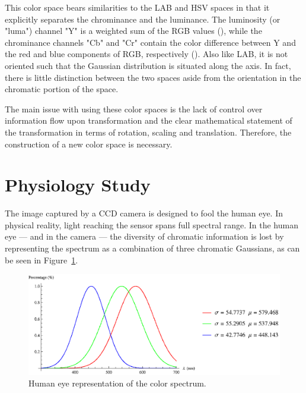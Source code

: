 This color space bears similarities to the LAB and HSV spaces in that it explicitly separates the chrominance and the luminance. The luminosity (or "luma") channel "Y" is a weighted sum of the RGB values (\cite{Poynton1997,Phung2002a}), while the chrominance channels "Cb" and "Cr" contain the color difference between Y and the red and blue components of RGB, respectively (\cite{Vezhnevets2003}). Also like LAB, it is not oriented such that the Gaussian distribution is situated along the axis. In fact, there is little distinction between the two spaces aside from the orientation in the chromatic portion of the space.

The main issue with using these color spaces is the lack of control over information flow upon transformation and the clear mathematical statement of the transformation in terms of rotation, scaling and translation. Therefore, the construction of a new color space is necessary.

\section{Physiology Study}\label{sec:PhysiologyStudy}

The image captured by a CCD camera is designed to fool the human eye. In physical reality, light reaching the sensor spans full spectral range. In the human eye --- and in the camera --- the diversity of chromatic information is lost by representing the spectrum as a combination of three chromatic Gaussians, as can be seen in Figure~\ref{fig:spectrum}.

\begin{figure}[h!]
  \centering
    \includegraphics[width=\textwidth]{Chapter2/Figs/spectrum.eps}
    \caption{Human eye representation of the color spectrum.}  \label{fig:spectrum}
\end{figure}

